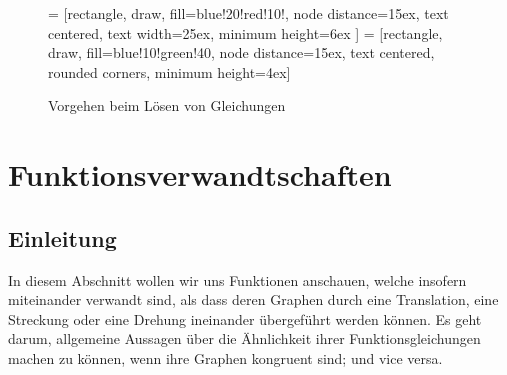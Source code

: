 \documentclass[%
11pt,%
twoside,%
titlepage,%
german,%
headsepline%
]{scrartcl}
\begin{document}
\begin{landscape}
\begin{figure}
\begin{center}

 = [rectangle, draw, fill=blue!20!red!10!, node distance=15ex, text centered, %
text width=25ex, minimum height=6ex
]
 = [rectangle, draw, fill=blue!10!green!40, node distance=15ex, text centered, rounded corners, minimum height=4ex]

\end{center}
\caption{Vorgehen beim Lösen von Gleichungen}
\end{figure}
\end{landscape}

\section{Funktionsverwandtschaften}

\subsection{Einleitung}
  In diesem Abschnitt wollen wir uns Funktionen anschauen, welche insofern miteinander verwandt sind, als dass deren Graphen durch eine Translation, eine Streckung oder eine Drehung ineinander übergeführt werden können. Es geht darum, allgemeine Aussagen über die Ähnlichkeit ihrer Funktionsgleichungen machen zu können, wenn ihre Graphen kongruent sind; und vice versa.
\end{document}
